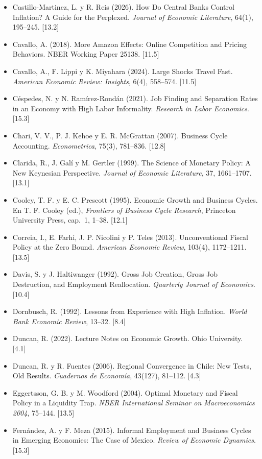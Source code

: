 \documentclass[11pt,a4paper]{article}
\begin{document}
{\begin{itemize}[leftmargin=1.4em,itemsep=1pt,label={}]
\item Castillo-Martinez, L. y R. Reis (2026). How Do Central Banks Control Inflation? A Guide for the Perplexed. \emph{Journal of Economic Literature}, 64(1), 195--245. [13.2]
\item Cavallo, A. (2018). More Amazon Effects: Online Competition and Pricing Behaviors. NBER Working Paper 25138. [11.5]
\item Cavallo, A., F. Lippi y K. Miyahara (2024). Large Shocks Travel Fast. \emph{American Economic Review: Insights}, 6(4), 558--574. [11.5]
\item Céspedes, N. y N. Ramírez-Rondán (2021). Job Finding and Separation Rates in an Economy with High Labor Informality. \emph{Research in Labor Economics}. [15.3]
\item Chari, V. V., P. J. Kehoe y E. R. McGrattan (2007). Business Cycle Accounting. \emph{Econometrica}, 75(3), 781--836. [12.8]
\item Clarida, R., J. Galí y M. Gertler (1999). The Science of Monetary Policy: A New Keynesian Perspective. \emph{Journal of Economic Literature}, 37, 1661--1707. [13.1]
\item Cooley, T. F. y E. C. Prescott (1995). Economic Growth and Business Cycles. En T. F. Cooley (ed.), \emph{Frontiers of Business Cycle Research}, Princeton University Press, cap.~1, 1--38. [12.1]
\item Correia, I., E. Farhi, J. P. Nicolini y P. Teles (2013). Unconventional Fiscal Policy at the Zero Bound. \emph{American Economic Review}, 103(4), 1172--1211. [13.5]
\item Davis, S. y J. Haltiwanger (1992). Gross Job Creation, Gross Job Destruction, and Employment Reallocation. \emph{Quarterly Journal of Economics}. [10.4]
\item Dornbusch, R. (1992). Lessons from Experience with High Inflation. \emph{World Bank Economic Review}, 13--32. [8.4]
\item Duncan, R. (2022). Lecture Notes on Economic Growth. Ohio University. [4.1]
\item Duncan, R. y R. Fuentes (2006). Regional Convergence in Chile: New Tests, Old Results. \emph{Cuadernos de Economía}, 43(127), 81--112. [4.3]
\item Eggertsson, G. B. y M. Woodford (2004). Optimal Monetary and Fiscal Policy in a Liquidity Trap. \emph{NBER International Seminar on Macroeconomics 2004}, 75--144. [13.5]
\item Fernández, A. y F. Meza (2015). Informal Employment and Business Cycles in Emerging Economies: The Case of Mexico. \emph{Review of Economic Dynamics}. [15.3]

\end{itemize}}
\end{document}
